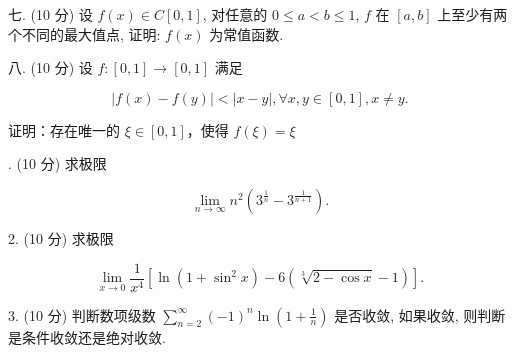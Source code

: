 \documentclass{examcollection}
\renewcommand{\displayformula}[1]{\[#1\]}
\begin{document}
{\begin{minipage}{\textwidth}
七. (10 分) 设 $f(x) \in C[0,1]$, 对任意的 $0 \leq a < b \leq 1$, $f$ 在 $[a,b]$ 上至少有两个不同的最大值点, 证明: $f(x)$ 为常值函数.\par
八. (10 分) 设 $f: [0,1] \to [0,1]$ 满足\par
\displayformula{| f (x) - f (y) | <   | x - y |, \forall x, y \in [ 0, 1 ], x \neq y.}\par
证明：存在唯一的 $\xi \in [0,1]$，使得 $f(\xi) = \xi$\par
{}. (10 分) 求极限\par
\displayformula{\lim _ {n \rightarrow \infty} n ^ {2} \left(3 ^ {\frac {1}{n}} - 3 ^ {\frac {1}{n + 1}}\right).}\par
2. (10 分) 求极限\par
\displayformula{\lim _ {x \to 0} \frac {1}{x ^ {4}} \left[ \ln (1 + \sin^ {2} x) - 6 (\sqrt [ 3 ]{2 - \cos x} - 1) \right].}\par
3. (10 分) 判断数项级数 $\sum_{n=2}^{\infty} (-1)^{n} \ln \left(1 + \frac{1}{n}\right)$ 是否收敛, 如果收敛, 则判断是条件收敛还是绝对收敛.\par
\end{minipage}}
\ifdim\dimexpr\ht\proofbox+\dp\proofbox\relax>\textheight
\noindent\resizebox{!}{\textheight}{\usebox{\proofbox}}\else\noindent\usebox{\proofbox}\fi\clearpage
\end{document}
